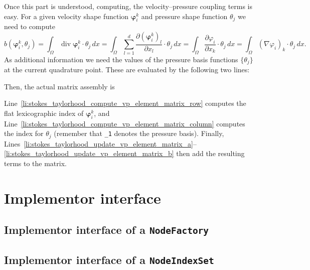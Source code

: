 \documentclass[a4paper,10pt,headings=normal,bibliography=totoc]{scrartcl}
\newcommand{\cpp}[1]{\lstinline[basicstyle=\ttfamily]!#1!}
\begin{document}
Once this part is understood, computing, the velocity--pressure coupling terms is easy.
For a given velocity shape function $\bm{\varphi}_i^k$ and pressure shape function $\theta_j$ we need
to compute
\begin{equation*}
 b(\bm{\varphi}_i^k,\theta_j)
 =
 \int_\Omega \operatorname{div} \bm{\varphi}_i^k \cdot \theta_j\,dx
 =
 \int_\Omega \sum_{l=1}^d \frac{\partial (\bm{\varphi}_i^k)_l}{\partial x_l} \cdot \theta_j\,dx
 =
 \int_\Omega \frac{\partial \varphi_i}{\partial x_k} \cdot \theta_j\,dx
 =
 \int_\Omega (\nabla \varphi_i)_k \cdot \theta_j\,dx.
\end{equation*}
As additional information we need the values of the pressure basis functions $\{\theta_j\}$ at the
current quadrature point.  These are evaluated by the following two lines:
%

%
Then, the actual matrix assembly is
%

%
Line~\ref{li:stokes_taylorhood_compute_vp_element_matrix_row} computes the flat lexicographic index of $\bm{\varphi}_i^k$,
and Line~\ref{li:stokes_taylorhood_compute_vp_element_matrix_column} computes the index for $\theta_j$ (remember that \cpp{_1} denotes
the pressure basis).  Finally, Lines~\ref{li:stokes_taylorhood_update_vp_element_matrix_a}--\ref{li:stokes_taylorhood_update_vp_element_matrix_b}
then add the resulting terms to the matrix.




\section{Implementor interface}

\subsection{Implementor interface of a \texttt{NodeFactory}}
\subsection{Implementor interface of a \texttt{NodeIndexSet}}






\end{document}
